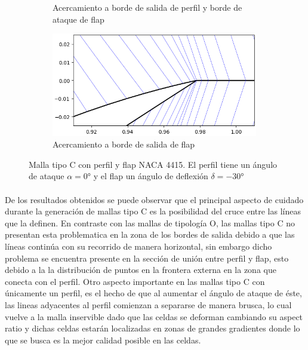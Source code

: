\documentclass[letterpaper, openright, 12pt]{book}
\begin{document}
\begin{figure}[htbp!]
\begin{subfigure}[c]{0.45\textwidth}
            \caption{Acercamiento a borde de salida de perfil y borde de
                ataque de flap}
            \label{fig:naca4415_c_flap_-30_both}
        \end{subfigure}
        \begin{subfigure}[c]{0.45\textwidth}
            \includegraphics[keepaspectratio,
                width=0.99\textwidth]{./img/naca4415_c_flap_-30_flap}
            \caption{Acercamiento a borde de salida de flap}
            \label{fig:naca4415_c_flap_-30_flap}
        \end{subfigure}
        \caption[Malla tipo C con perfil y flap NACA 4415 a
            $-30\si{\degree}$]{Malla tipo C con perfil y flap NACA 4415. El
            perfil tiene un ángulo de ataque $\alpha = 0\si{\degree}$ y el
            flap un ángulo de deflexión $\delta = -30\si{\degree}$}
        \label{fig:naca4415_c_flap_-30_}
    \end{figure}

    \paragraph*{}
    De los resultados obtenidos se puede observar que el principal aspecto de
    cuidado durante la generación de mallas tipo C es la posibilidad del cruce
    entre las líneas que la definen. En contraste con las mallas de tipología
    O, las mallas tipo C no presentan esta problematica en la zona de los
    bordes de salida debido a que las líneas continúa con su recorrido de
    manera horizontal, sin embargo dicho problema se encuentra presente en la
    sección de unión entre perfil y flap, esto debido a la la distribución de
    puntos en la frontera externa en la zona que conecta con el perfil.
    Otro aspecto importante en las mallas tipo C con únicamente un perfil, es
    el hecho de que al aumentar el ángulo de ataque de éste, las lineas
    adyacentes al perfil comienzan a separarse de manera brusca, lo cual vuelve
    a la malla inservible dado que las celdas se deforman cambiando su aspect
    ratio y dichas celdas estarán localizadas en zonas de grandes gradientes
    donde lo que se busca es la mejor calidad posible en las celdas.
\end{document}
